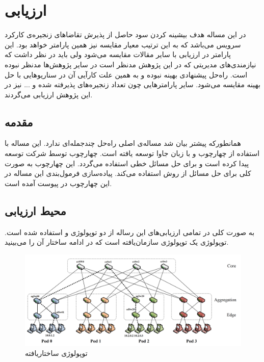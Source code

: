 
\chapter{ارزیابی}

در این مساله هدف بیشینه کردن سود حاصل از پذیرش تقاضاهای زنجیره‌ی کارکرد سرویس می‌باشد که به این ترتیب معیار مقایسه نیز همین پارامتر خواهد بود. این پارامتر در ارزیابی با سایر مقالات مقایسه می‌شود ولی باید در نظر داشت که نیازمندی‌های مدیریتی که در این پژوهش مدنظر است در سایر پژوهش‌ها مدنظر نبوده است.
راه‌حل پیشنهادی بهینه نبوده و به همین علت کارآیی آن در سناریوهایی با حل بهینه مقایسه می‌شود.
سایر پارامترهایی چون تعداد زنجیره‌های پذیرفته شده و ... نیز در این پژوهش ارزیابی می‌گردند.

\section{مقدمه}

همانطورکه پیشتر بیان شد مساله‌ی اصلی راه‌حل چندجمله‌ای ندارد. این مساله با استفاده از چهارچوب  و با زبان جاوا
توسعه یافته است. چهارچوب  توسط شرکت  توسعه پیدا کرده است و برای حل مسائل خطی استفاده می‌گردد. این
چهارچوب به صورت کلی برای حل مسائل  از روش  استفاده می‌کند. پیاده‌سازی فرمول‌بندی این مساله در این چهارچوب
در پیوست آمده است.

\section{محیط ارزیابی}
به صورت کلی در تمامی ارزیابی‌های این رساله از دو توپولوژی  و  استفاده شده است.
توپولوژی  یک توپولوژی سازمان‌یافته است که در ادامه ساختار آن را می‌بینید.


\begin{figure}[!h]
\center\includegraphics[scale=.25]{images/fattree}
\caption{توپولوژی ساختاریافته }
\label{fig.2}
\end{figure}

